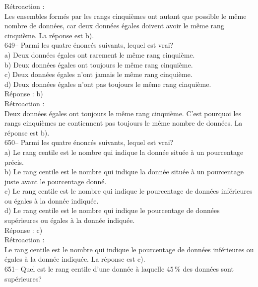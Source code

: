 ﻿\documentclass[letterpaper, 12pt]{article}
\begin{document}
R\'etroaction : \\
Les ensembles form\'es par les rangs cinqui\`emes ont autant que possible le
m\^eme nombre de donn\'ees, car deux donn\'ees \'egales doivent avoir le
m\^eme rang cinqui\`eme.  La r\'eponse est b).\\

649-- Parmi les quatre \'enonc\'es suivants, lequel est vrai?\\
a) Deux donn\'ees \'egales ont rarement le m\^eme rang cinqui\`eme.\\
b) Deux donn\'ees \'egales ont toujours le m\^eme rang cinqui\`eme.\\
c) Deux donn\'ees \'egales n'ont jamais le m\^eme rang cinqui\`eme.\\
d) Deux donn\'ees \'egales n'ont pas toujours le m\^eme rang cinqui\`eme.\\

R\'eponse : b)\\

R\'etroaction : \\
Deux donn\'ees \'egales ont toujours le m\^eme rang cinqui\`eme.  C'est
pourquoi les rangs cinqui\`emes ne contiennent pas toujours le m\^eme nombre
de donn\'ees.  La r\'eponse est b).\\

650-- Parmi les quatre \'enonc\'es suivants, lequel est vrai?\\
a) Le rang centile est le nombre qui indique la donn\'ee situ\'ee \`a un
pourcentage pr\'ecis.  \\
b) Le rang centile est le nombre qui indique la donn\'ee situ\'ee \`a un
pourcentage juste avant le pourcentage donn\'e.\\
c) Le rang centile est le nombre qui indique le pourcentage de donn\'ees
inf\'erieures ou \'egales \`a la donn\'ee indiqu\'ee. \\
d) Le rang centile est le nombre qui indique le pourcentage de donn\'ees
sup\'erieures ou \'egales \`a la donn\'ee indiqu\'ee.\\

R\'eponse : c)\\

R\'etroaction : \\
Le rang centile est le nombre qui indique le pourcentage de donn\'ees
inf\'erieures ou \'egales \`a la donn\'ee indiqu\'ee. La r\'eponse est c).\\

651-- Quel est le rang centile d'une donn\'ee \`a laquelle $45\,\%$ des
donn\'ees sont sup\'erieures?\\
\end{document}

